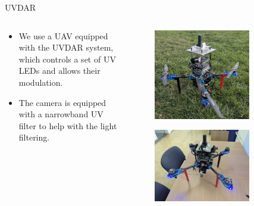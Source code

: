 \documentclass{beamer}
\begin{document}
\begin{frame}{UVDAR}

\begin{columns}[T]

\begin{column}{0.48\textwidth}
    \vspace{0.5cm}
    \begin{itemize}
        \item We use a UAV equipped with the UVDAR system, which controls a set of UV LEDs and allows their modulation.
        \item The camera is equipped with a narrowband UV filter to help with the light filtering.
    \end{itemize}
\end{column}

\begin{column}{0.48\textwidth}
    \begin{figure}[H]
        \centering
        \includegraphics[width=0.75\textwidth]{../fig/photos/uvdar.jpg}
        \label{fig:uvdar}
    \end{figure}
    \vspace{-0.5cm}
    \begin{figure}[H]
        \centering
        \includegraphics[width=0.75\textwidth]{../fig/photos/uvdar1.jpg}
        \label{fig:uvdar1}
    \end{figure}
\end{column}

\end{columns}

\end{frame}
\end{document}
